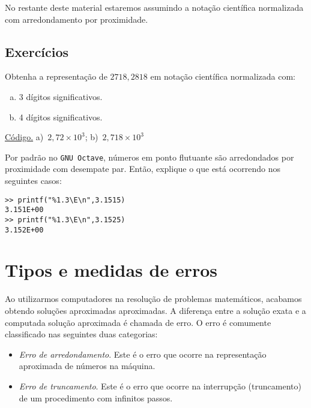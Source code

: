 No restante deste material estaremos assumindo a notação científica normalizada com arredondamento por proximidade.

\subsection*{Exercícios}

\begin{exer}
  Obtenha a representação de $2718,2818$ em notação científica normalizada com:
  \begin{enumerate}[a)]
  \item 3 dígitos significativos.
  \item 4 dígitos significativos.
  \end{enumerate}
\end{exer}
\begin{resp}
    \ifisoctave 
    \href{https://github.com/phkonzen/notas/blob/master/src/MatematicaNumerica/cap_aritm/dados/exer_notcient/exer_notcient.m}{Código.} 
  \fi
  a)~$2,72\times 10^3$; b)~$2,718\times 10^3$
\end{resp}

\ifisoctave
Por padrão no \verb+GNU Octave+, números em ponto flutuante são arredondados por proximidade com desempate par. Então, explique o que está ocorrendo nos seguintes casos:
\begin{verbatim}
>> printf("%1.3\E\n",3.1515)
3.151E+00
>> printf("%1.3\E\n",3.1525)
3.152E+00
\end{verbatim}
\fi

\section{Tipos e medidas de erros}\label{cap_aritm_sec_erros}

Ao utilizarmos computadores na resolução de problemas matemáticos, acabamos obtendo soluções aproximadas aproximadas. A diferença entre a solução exata e a computada solução aproximada é chamada de erro. O erro é comumente classificado nas seguintes duas categorias:
\begin{itemize}
\item \emph{Erro de arredondamento}. Este é o erro que ocorre na representação aproximada de números na máquina.
\item \emph{Erro de truncamento}. Este é o erro que ocorre na interrupção (truncamento) de um procedimento com infinitos passos.
\end{itemize}

